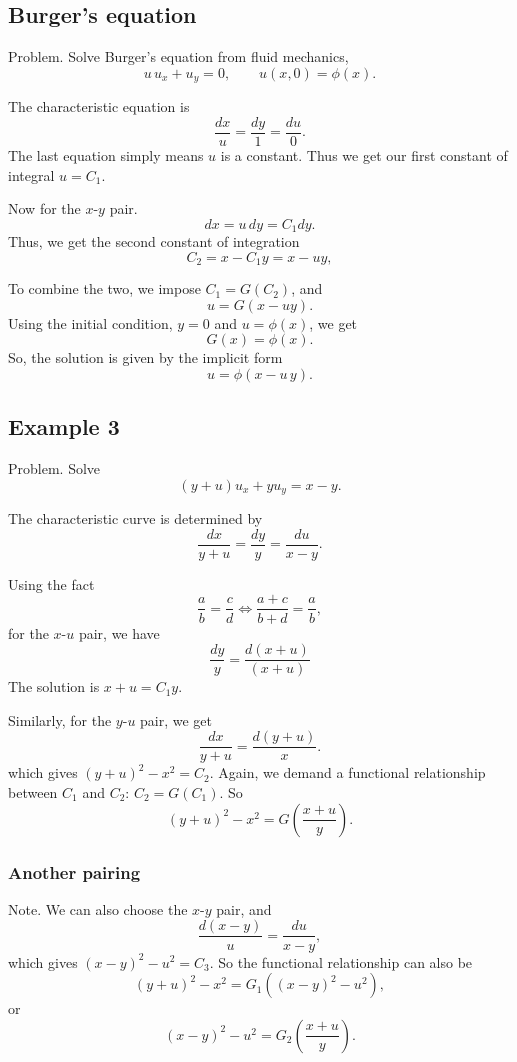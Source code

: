 \documentclass{article}
\begin{document}
\subsection{Burger's equation}

Problem.
Solve Burger's equation from fluid mechanics,
$$
u \, u_x + u_y = 0,
\qquad
u(x, 0) = \phi(x).
$$

The characteristic equation is
$$
\frac{ dx } { u }
=
\frac{ dy } { 1 }
=
\frac{ du } { 0 }.
$$
The last equation simply means $u$ is a constant.
Thus we get our first constant of integral
$u = C_1$.

Now for the $x$-$y$ pair.
$$
dx = u \, dy = C_1 dy.
$$
Thus, we get the second constant of integration
$$
C_2 = x - C_1 y = x - u y,
$$

To combine the two, we
impose $C_1 = G(C_2)$, and
$$
u = G(x - u y).
$$
Using the initial condition, $y = 0$ and $u = \phi(x)$,
we get
$$
G(x) = \phi(x).
$$
So, the solution is given by the implicit form
$$
u = \phi(x - u \, y).
$$


\subsection{Example 3}

Problem.
Solve
$$
(y + u) u_x + y u_y = x - y.
$$

The characteristic curve is determined by
$$
\frac{ dx } { y + u }
=
\frac{ dy } { y }
=
\frac{ du } { x - y }.
$$

Using the fact
$$
\frac{a}{b} = \frac{c}{d}
\Longleftrightarrow
\frac{a + c}{b + d} = \frac{a}{b},
$$
for the $x$-$u$ pair, we have
$$
\frac{ dy } { y }
=
\frac{ d(x+u) } { (x + u) }
$$
The solution is $x+u = C_1 y$.

Similarly, for the $y$-$u$ pair, we get
$$
\frac{ dx } { y + u }
=
\frac{ d(y+u) } { x }.
$$
which gives
$(y+u)^2 - x^2 = C_2$.
%
Again, we demand a functional relationship between $C_1$ and $C_2$:
$C_2 = G(C_1)$.
So
\begin{equation}
(y+u)^2 - x^2 = G\left(\frac{x+u}{y}\right).
\label{eq:qs_ex3_sol1}
\end{equation}

\subsubsection*{Another pairing}

Note. We can also choose the $x$-$y$ pair, and
$$
\frac{ d(x - y) } { u }
=
\frac{ du } { x - y },
$$
which gives $(x - y)^2 - u^2 = C_3$.
So the functional relationship can also be
$$
(y+u)^2 - x^2 = G_1\left( (x-y)^2 - u^2 \right),
$$
or
\begin{equation}
(x-y)^2 - u^2 = G_2\left( \frac{x+u}{y} \right).
\label{eq:qs_ex3_sol2}
\end{equation}
\end{document}
